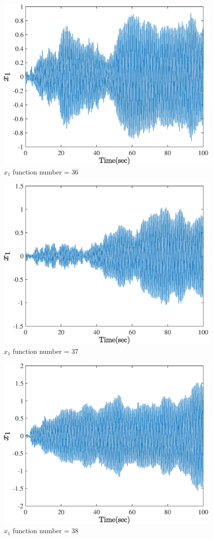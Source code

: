  \begin{figure}[H] 
  	\caption{$x_1$ function number = 36} 
  	\centering 
  	\includegraphics[width=12cm]{../Figure/Q5/part_a/36} 
  \end{figure}
  \begin{figure}[H] 
  	\caption{$x_1$ function number = 37} 
  	\centering 
  	\includegraphics[width=12cm]{../Figure/Q5/part_a/37} 
  \end{figure}
  \begin{figure}[H] 
  	\caption{$x_1$ function number = 38} 
  	\centering 
  	\includegraphics[width=12cm]{../Figure/Q5/part_a/38} 
  \end{figure}
